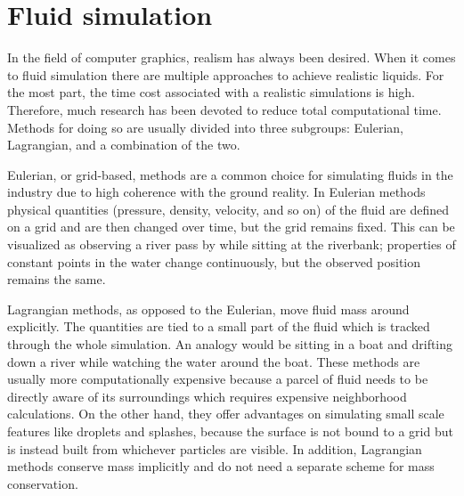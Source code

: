 \documentclass[../../main.tex]{subfiles}
\begin{document}
\tracingall


\section{Fluid simulation}
In the field of computer graphics, realism has always been desired. When it comes to fluid simulation there are multiple approaches to achieve realistic liquids. For the most part, the time cost associated with a realistic simulations is high. Therefore, much research has been devoted to reduce total computational time. Methods for doing so are usually divided into three subgroups: Eulerian, Lagrangian, and a combination of the two.






Eulerian, or grid-based, methods are a common choice for simulating fluids in the industry due to high coherence with the ground reality. In Eulerian methods physical quantities (pressure, density, velocity, and so on) of the fluid are defined on a grid and are then changed over time, but the grid remains fixed. This can be visualized as observing a river pass by while sitting at the riverbank; properties of constant points in the water change continuously, but the observed position remains the same. 

Lagrangian methods, as opposed to the Eulerian, move fluid mass around explicitly. The quantities are tied to a small part of the fluid which is tracked through the whole simulation. An analogy would be sitting in a boat and drifting down a river while watching the water around the boat. These methods are usually more computationally expensive because a parcel of fluid needs to be directly aware of its surroundings which requires expensive neighborhood calculations. On the other hand, they offer advantages on simulating small scale features like droplets and splashes, because the surface is not bound to a grid but is instead built from whichever particles are visible. In addition, Lagrangian methods conserve mass implicitly and do not need a separate scheme for mass conservation. 
\end{document}
